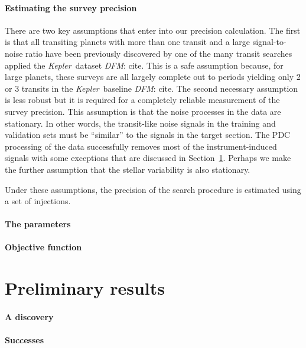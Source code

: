 \documentclass[12pt,preprint]{aastex}
\newcommand{\project}[1]{\textsl{#1}}
\newcommand{\kepler}{\project{Kepler}}
\newcommand{\sectionname}{Section}
\newcommand{\Sect}[1]{\sectionname~\ref{sect:#1}}
\newcommand{\sect}[1]{\Sect{#1}}
\newcommand{\sectlabel}[1]{\label{sect:#1}}
\newcommand{\todo}[3]{{\color{#2}\emph{#1}: #3}}
\newcommand{\dfmtodo}[1]{\todo{DFM}{red}{#1}}
\begin{document}
\paragraph{Estimating the survey precision}

There are two key assumptions that enter into our precision calculation.
The first is that all transiting planets with more than one transit and a
large signal-to-noise ratio have been previously discovered by one of the many
transit searches applied the \kepler\ dataset \dfmtodo{cite}.
This is a safe assumption because, for large planets, these surveys are all
largely complete out to periods yielding only 2 or 3 transits in the \kepler\
baseline \dfmtodo{cite}.
The second necessary assumption is less robust but it is required for a
completely reliable measurement of the survey precision.
This assumption is that the noise processes in the data are stationary.
In other words, the transit-like noise signals in the training and validation
sets must be ``similar'' to the signals in the target section.
The PDC processing of the data successfully removes most of the
instrument-induced signals with some exceptions that are discussed in
\sect{demo}.
Perhaps we make the further assumption that the stellar variability is
also stationary.

Under these assumptions, the precision of the search procedure is
estimated using a set of injections.


\paragraph{The parameters}

\paragraph{Objective function}


\section{Preliminary results}\sectlabel{demo}

\paragraph{A discovery}



\paragraph{Successes}
\end{document}
